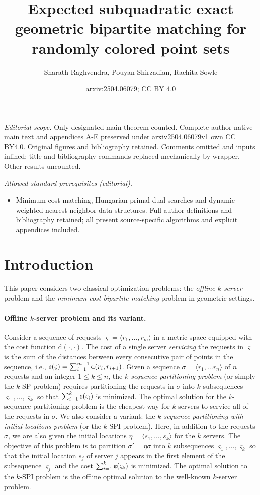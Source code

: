 \documentclass[11pt,onecolumn]{article}
\title{Expected subquadratic exact geometric bipartite matching for randomly colored point sets}
\author{Sharath Raghvendra, Pouyan Shirzadian, Rachita Sowle}
\date{arxiv:2504.06079; CC BY 4.0}
\newcommand{\distance}[2]{\mathrm{d}(#1, #2)}
\newcommand{\requests}{\sigma}
\newcommand{\seqcost}{\text{\textcent}}
\newcommand\myparagraph[1]{\paragraph{#1}}
\begin{document}
\maketitle
\noindent\textit{Editorial scope.} Only designated main theorem counted. Complete author native main text and appendices A-E preserved under arxiv2504.06079v1 own CC BY4.0. Original figures and bibliography retained. Comments omitted and inputs inlined; title and bibliography commands replaced mechanically by wrapper. Other results uncounted.\par\medskip
\noindent\textit{Allowed standard prerequisites (editorial).}\begin{itemize}
\item Minimum-cost matching, Hungarian primal-dual searches and dynamic weighted nearest-neighbor data structures. Full author definitions and bibliography retained; all present source-specific algorithms and explicit appendices included.
\end{itemize}\medskip

\section{Introduction}\label{sec:introduction}


This paper considers two classical optimization problems: the \emph{offline $k$-server} problem and the \emph{minimum-cost bipartite matching} problem in geometric settings. 
%

 
\myparagraph{Offline $k$-server problem and its variant.} Consider a sequence of requests $\varsigma = \langle r_1,\ldots, r_m \rangle$ in a metric space equipped with the cost function $\distance{\cdot}{\cdot}$. The cost of a single server \emph{servicing} the requests in $\varsigma$ is the sum of the distances between every consecutive pair of points in the sequence, i.e.,  $\seqcost(\varsigma)=\sum_{i=1}^{m-1} \distance{r_i}{r_{i+1}}$. Given a sequence $\requests = \langle r_1,\ldots r_n\rangle$ of $n$ requests and an integer $1 \le k \le n$, the \emph{$k$-sequence partitioning problem} (or simply the $k$-SP problem) requires partitioning the requests in $\requests$ into $k$ subsequences $\varsigma_1, \ldots, \varsigma_k$ so that $\sum_{i=1}^{k}\seqcost(\varsigma_i)$ is minimized. The optimal solution for the $k$-sequence partitioning problem is the cheapest way for $k$ servers to service all of the requests in $\requests$. 
We also consider a variant: the \emph{$k$-sequence partitioning with initial locations problem} (or the $k$-SPI problem). Here,
 in addition to the requests $\requests$, we are also given the initial locations $\eta=\langle s_1,\ldots, s_k\rangle$ for the $k$ servers. The objective of this problem is to partition $\requests' = \eta \requests$ into $k$ subsequences $\varsigma_1,\ldots, \varsigma_k$ so that the initial location $s_j$ of server $j$ appears in the first element of the subsequence $\varsigma_j$ and the cost $\sum_{i=1}^{k}\seqcost(\varsigma_k)$ is minimized. 
The optimal solution to the $k$-SPI problem is the offline optimal solution to the well-known $k$-server problem. 
\end{document}
